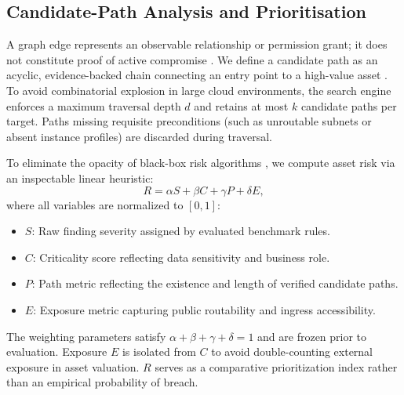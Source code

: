 \documentclass[conference]{IEEEtran}
\begin{document}
\subsection{Candidate-Path Analysis and Prioritisation}
A graph edge represents an observable relationship or permission grant; it does not constitute proof of active compromise \cite{sheyner2002automated,sabur2022scalable}. We define a candidate path as an acyclic, evidence-backed chain connecting an entry point to a high-value asset \cite{elmiger2023attackpaths}. To avoid combinatorial explosion in large cloud environments, the search engine enforces a maximum traversal depth $d$ and retains at most $k$ candidate paths per target. Paths missing requisite preconditions (such as unroutable subnets or absent instance profiles) are discarded during traversal.

To eliminate the opacity of black-box risk algorithms \cite{ribeiro2016lime,lundberg2017shap}, we compute asset risk via an inspectable linear heuristic:
\begin{equation}
R = \alpha S + \beta C + \gamma P + \delta E,
\label{eq:risk}
\end{equation}
where all variables are normalized to $[0,1]$:
\begin{itemize}
\item $S$: Raw finding severity assigned by evaluated benchmark rules.
\item $C$: Criticality score reflecting data sensitivity and business role.
\item $P$: Path metric reflecting the existence and length of verified candidate paths.
\item $E$: Exposure metric capturing public routability and ingress accessibility.
\end{itemize}
The weighting parameters satisfy $\alpha + \beta + \gamma + \delta = 1$ and are frozen prior to evaluation. Exposure $E$ is isolated from $C$ to avoid double-counting external exposure in asset valuation. $R$ serves as a comparative prioritization index rather than an empirical probability of breach.
\end{document}
